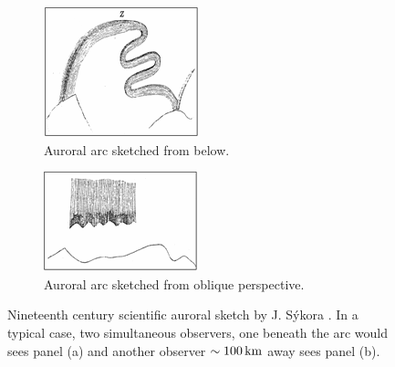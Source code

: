 \begin{figure}\centering
    \begin{subfigure}[t]{0.45\linewidth}\centering
        \includegraphics[width=\linewidth]{gfx/chernouss6a}
        \caption{Auroral arc sketched from below.}\label{fig:1a}		
    \end{subfigure}
    \begin{subfigure}[t]{0.45\linewidth}\centering
        \includegraphics[width=\linewidth]{gfx/chernouss6b}
        \caption{Auroral arc sketched from oblique perspective.}\label{fig:1b}		
    \end{subfigure}
    \caption{Nineteenth century scientific auroral sketch by J. Sýkora \citep{chernouss2005}. 
    	In a typical case, two simultaneous observers, one beneath the arc would sees panel (a) and another observer $\sim \unit[100]{km}$ away sees panel (b).}
    \label{fig:chernouss6}
\end{figure}

